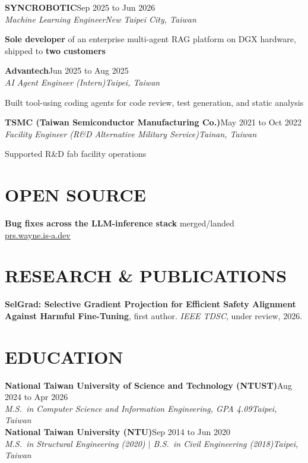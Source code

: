\documentclass[10pt,letterpaper]{article}
\newcommand{\link}[2]{\href{#1}{\underline{#2}}}
\newcommand{\entry}[4]{%
  \textbf{#1}\hfill #2\\
  \textit{#3}\hfill \textit{#4}\\[0.15em]}
\begin{document}
\entry{SYNCROBOTIC}{Sep 2025 to Jun 2026}{Machine Learning Engineer}{New Taipei City, Taiwan}
\begin{tight}
  \item \textbf{Sole developer} of an enterprise multi-agent RAG platform on DGX hardware, shipped to \textbf{two customers}
\end{tight}
\vspace{0.25em}

\entry{Advantech}{Jun 2025 to Aug 2025}{AI Agent Engineer (Intern)}{Taipei, Taiwan}
\begin{tight}
  \item Built tool-using coding agents for code review, test generation, and static analysis
\end{tight}
\vspace{0.25em}

\entry{TSMC (Taiwan Semiconductor Manufacturing Co.)}{May 2021 to Oct 2022}{Facility Engineer (R\&D Alternative Military Service)}{Tainan, Taiwan}
\begin{tight}
  \item Supported R\&D fab facility operations
\end{tight}

\section*{\scshape OPEN SOURCE}
\textbf{Bug fixes across the LLM-inference stack}\hfill \upstreammerged{} merged/landed\\
\textit{\upstreamgroups}\hfill \link{https://prs.wayne.is-a.dev}{prs.wayne.is-a.dev}\\[0.15em]
\section*{\scshape RESEARCH \& PUBLICATIONS}
\textbf{SelGrad: Selective Gradient Projection for Efficient Safety Alignment Against Harmful Fine-Tuning},
first author. \textit{IEEE TDSC}, under review, 2026.

\section*{\scshape EDUCATION}
\entry{National Taiwan University of Science and Technology (NTUST)}{Aug 2024 to Apr 2026}{M.S.\ in Computer Science and Information Engineering, GPA 4.09}{Taipei, Taiwan}
\vspace{0.2em}
\entry{National Taiwan University (NTU)}{Sep 2014 to Jun 2020}{M.S.\ in Structural Engineering (2020) $|$ B.S.\ in Civil Engineering (2018)}{Taipei, Taiwan}
\end{document}
